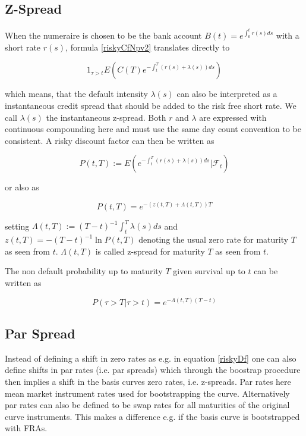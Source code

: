 \documentclass{article}%
\begin{document}
\subsection{Z-Spread}

When the numeraire is chosen to be the bank account $B(t) = e^{\int_{0}^{t} r(s) ds}$ with a short rate $r(s)$, formula
\ref{riskyCfNpv2} translates directly to

\begin{equation}\label{zSpread}
1_{\tau > t} E\left( C(T) e^{-\int_{t}^{T} (r(s)+\lambda(s))ds} \right)
\end{equation}

which means, that the default intensity $\lambda(s)$ can also be interpreted as a instantaneous credit spread that should be added
to the risk free short rate. We call $\lambda(s)$ the instantaneous z-spread.
Both $r$ and $\lambda$ are expressed with continuous compounding here and must use the same day count convention
to be consistent. A risky discount factor can then be written as

\begin{equation}\label{riskyDf}
P(t,T) := E( e^{-\int_{t}^{T} (r(s)+\lambda(s)) ds } | \mathcal{F}_t )
\end{equation}

or also as 

\begin{equation}\label{riskyDf2}
P(t,T) = e^{-(z(t,T)+\Lambda(t,T))T}
\end{equation}

setting $\Lambda(t,T) := (T-t)^{-1} \int_{t}^{T} \lambda(s) ds$ and $z(t,T) = -(T-t)^{-1} \ln P(t,T)$ denoting the usual zero rate for maturity $T$ as seen from $t$. $\Lambda(t,T)$ is called z-spread for maturity $T$ as seen from $t$.

The non default probability up to maturity $T$ given survival up to $t$ can be written as

\begin{equation}\label{NdfProb2}
P(\tau > T | \tau > t) = e^{-\Lambda(t,T)(T-t)}
\end{equation}

\subsection{Par Spread}

Instead of defining a shift in zero rates as e.g. in equation \ref{riskyDf} one can also define shifts in par rates (i.e. par spreads) which through the boostrap procedure then implies a shift in the basis curves zero rates, i.e. z-spreads. Par rates here mean market instrument rates used for bootstrapping the curve. Alternatively par rates can also be defined to be swap rates for all maturities of the original curve instruments. This makes a difference e.g. if the basis curve is bootstrapped with FRAs.
\end{document}
